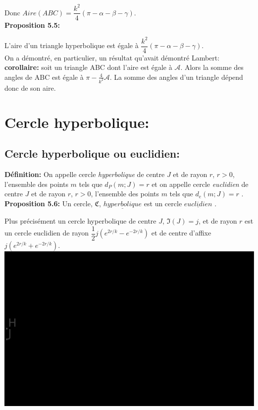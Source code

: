\documentclass[a4paper, 12pt, twoside]{book}
\begin{document}
  Donc $Aire(ABC)=\dfrac{k^{2}}{4}(\pi-\alpha-\beta-\gamma)$.\\
  
  \textbf{Proposition 5.5:}\
  
   L'aire d'un triangle hyperbolique est égale à 
   $\dfrac{k^{2}}{4}(\pi-\alpha-\beta-\gamma)$.\\
   
   On a démontré, en particulier, un résultat qu'avait démontré Lambert:\\
   
   \textbf{corollaire:} soit un triangle ABC dont l'aire est égale à $\mathcal{A}$. Alors la somme des angles de ABC est égale à $\pi-\frac{4}{k^{2}}\mathcal{A}$. La somme des angles d'un triangle dépend donc de son aire.\\
    
           
   
   
 \newpage  \section{Cercle hyperbolique:}
 
  \subsection{Cercle hyperbolique ou euclidien:}
 
 
 \textbf{Définition:} On appelle cercle \textit{hyperbolique }de centre $J$ et de rayon $r$, $r>0$, l'ensemble des points $m$ tels que \textit{$d_{P}(m;J)=r$} et on appelle cercle \textit{euclidien} de centre $J$ et de rayon $r$, $r>0$, l'ensemble des points $m$ tels que \textit{$d_{e}(m;J)=r$} .\\
  
 
 \textbf{Proposition 5.6:} Un cercle, $\mathfrak{C}$, $\underline{hyperbolique}$  est un cercle $\underline{euclidien}$ .\
 
 Plus précisément un cercle hyperbolique de centre $J$, $\Im(J)=j$, et de rayon $r$ est un cercle euclidien de rayon $\dfrac{1}{2}j(e^{2r/k}-e^{-2r/k})$ et de centre d'affixe $j(e^{2r/k}+e^{-2r/k})$. \\
 

 \includegraphics[scale=0.2]{figures/hyper6.eps}
 
\end{document}
